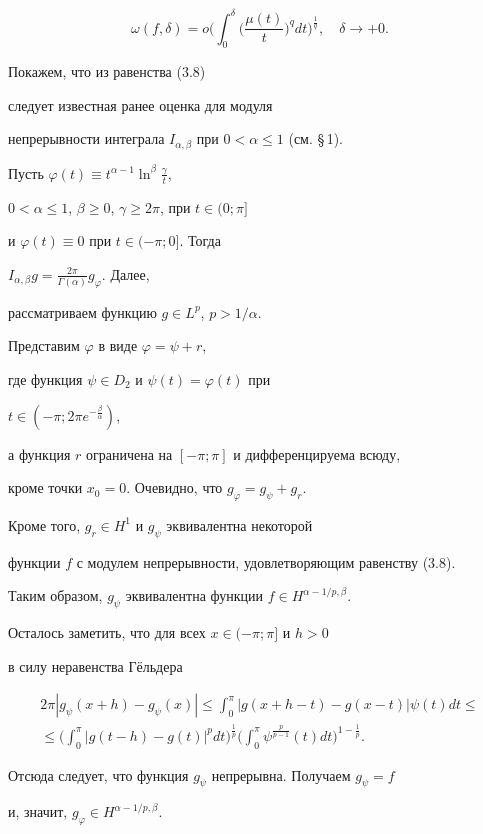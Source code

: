 \begin{equation}


\omega(f,\delta)=o\bigg(\int_0^\delta\bigg(\frac{\mu(t)}{t}\bigg)^q dt


\bigg)^{\frac{1}{q}},\quad \delta\to+0.


\end{equation}





\begin{note}


Покажем, что из равенства (3.8)


следует известная ранее оценка для модуля


непрерывности интеграла $I_{\alpha,\beta}$ при $0<\alpha\le1$ (см. \S\,1).


Пусть $\varphi(t)\equiv t^{\alpha-1}\ln^\beta\frac{\gamma}{t}$,


$0<\alpha\le1$, $\beta\ge0$, $\gamma\ge2\pi$, при $t\in(0;\pi]$


и $\varphi(t)\equiv0$ при $t\in(-\pi;0]$. Тогда


$I_{\alpha,\beta}g=\frac{2\pi}{\Gamma(\alpha)}g_\varphi$. Далее,


рассматриваем функцию $g\in L^p$, $p>1/\alpha$.


Представим $\varphi$ в виде $\varphi=\psi+r$,


где функция $\psi\in D_2$ и $\psi(t)=\varphi(t)$ при


$t\in(-\pi;2\pi e^{-\frac{\beta}{\alpha}})$,


а функция $r$ ограничена на $[-\pi;\pi]$ и дифференцируема всюду,


кроме точки $x_0=0$. Очевидно, что $g_\varphi=g_\psi+g_r$.


Кроме того, $g_r\in H^1$ и $g_\psi$ эквивалентна некоторой


функции $f$ с модулем непрерывности, удовлетворяющим равенству (3.8).


Таким образом, $g_\psi$ эквивалентна функции $f\in H^{\alpha-1/p,\beta}$.


Осталось заметить, что для всех $x\in(-\pi;\pi]$ и $h>0$


в силу неравенства Г\"ельдера


\begin{multline*}


2\pi|g_\psi(x+h)-g_\psi(x)|\le\int_0^\pi|g(x+h-t)-g(x-t)|\psi(t)dt\le \\


%


\le\bigg(\int_0^\pi|g(t-h)-g(t)|^p dt\bigg)^{\frac{1}{p}}


\bigg(\int_0^\pi\psi^{\frac{p}{p-1}}(t)dt\bigg)^{1-\frac{1}{p}}.


\end{multline*}


Отсюда следует, что функция $g_\psi$ непрерывна. Получаем $g_\psi=f$


и, значит, $g_\varphi\in H^{\alpha-1/p,\beta}$.


\end{note}





